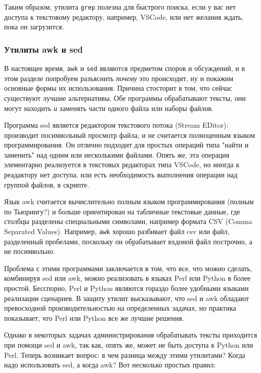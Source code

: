 \documentclass{article}
\begin{document}
Таким образом, утилита \texttt{grep} полезна для быстрого поиска, если у
вас нет доступа к текстовому редактору, например, VSCode, или нет
желания ждать, пока он загрузится.

\hypertarget{awk-and-sed}{%
\subsubsection{\texorpdfstring{\protect\hyperlink{awk-and-sed}{}Утилиты
awk и sed}{Утилиты awk и sed}}\label{awk-and-sed}}

В настоящее время, \texttt{awk} и \texttt{sed} являются предметом споров
и обсуждений, и в этом разделе попробуем разъяснить \emph{почему} это
происходит, ну и покажим основные формы их использования. Причина
стосторит в том, что сейчас существуют лучшие альтернативы. Обе
программы обрабатывают тексты, они могут находить \emph{и} заменять
части одного файла или наборы файлов.

Программа sed является редактором текстового потока (Stream EDitor):
производит посимвольный просмотр файла, и не считается полноценным
языком программирования. Он отлично подходит для простых операций типа
"найти и заменить" над одним или несколькими файлами. Опять же, эта
операция элементарно реализуется в текстовых редакторах типа VSCode, но
иногда к реадактору нет доступа, или есть необходимость выполнения
операции над группой файлов, в скрипте.

Язык awk считается вычислительно полным языком программирования (полным
по Тьюрингу?) и больше ориентирован на табличные текстовые данные, где
столбцы разделены специальными символами, например формата CSV (Comma
Separated Values). Например, \texttt{awk} хорошо разбивает файл csv или
файл, разделенный пробелами, поскольку он обрабатывает вхдоной файл
построчно, а не посимвольно.

Проблема с этими программами заключается в том, что все, что можно
сделать, комбинируя sed или awk, можно реализовать в языках Perl или
Python в более простой. Бесспорно, Perl и Python являются гораздо более
удобными языками реализации сценариев. В защиту утилит высказывают, что
sed и awk обладают превосходной производительностью на определенных
задачах, но практика показывает, что Perl или Python все же лучшие
решения.

Однако в некоторых задачах администрирования обрабатывать тексты
приходится при помощи sed и awk, так как, опять же, может не быть
доступа к Python или Perl. Теперь возникает вопрос: в чем разница между
этими утилитами? Когда надо использовать sed, а когда awk? Вот несколько
простых правил:
\end{document}
